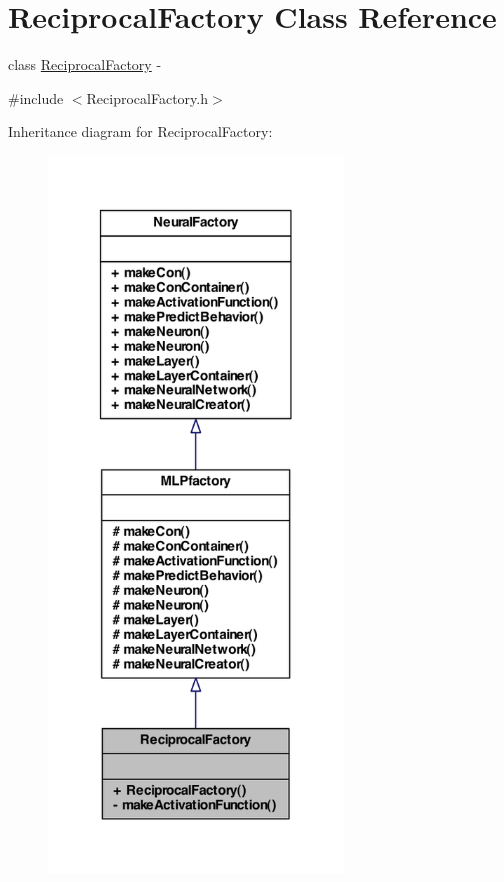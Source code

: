 \hypertarget{class_reciprocal_factory}{
\section{ReciprocalFactory Class Reference}
\label{class_reciprocal_factory}
}


class \hyperlink{class_reciprocal_factory}{ReciprocalFactory} -\/  




{\ttfamily \#include $<$ReciprocalFactory.h$>$}



Inheritance diagram for ReciprocalFactory:
\nopagebreak
\begin{figure}[H]
\begin{center}
\leavevmode
\includegraphics[width=222pt]{class_reciprocal_factory__inherit__graph}
\end{center}
\end{figure}


